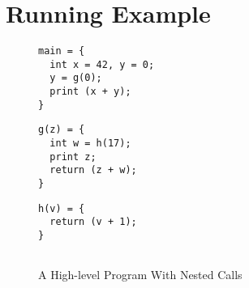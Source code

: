 \documentclass[acmsmall,review,anonymous]{acmart}\settopmatter{printfolios=true,printccs=false,printacmref=false}
\begin{document}
%
%
%
%
%
%
%
%
%

\section{Running Example}
\label{sec:running-example}

\begin{figure}[b]
\hfill
    \begin{minipage}{.3\textwidth}
\begin{verbatim}
main = {
  int x = 42, y = 0;
  y = g(0);
  print (x + y);
}
\end{verbatim}
    \end{minipage}
    \begin{minipage}{.3\textwidth}
\begin{verbatim}
g(z) = {
  int w = h(17);
  print z;
  return (z + w);
}
\end{verbatim}
    \end{minipage}
    \begin{minipage}{.3\textwidth}
\begin{verbatim}
h(v) = {
  return (v + 1);
}


\end{verbatim}
    \end{minipage}
\caption{A High-level Program With Nested Calls}
\label{fig:running-program}
\end{figure}
\end{document}
